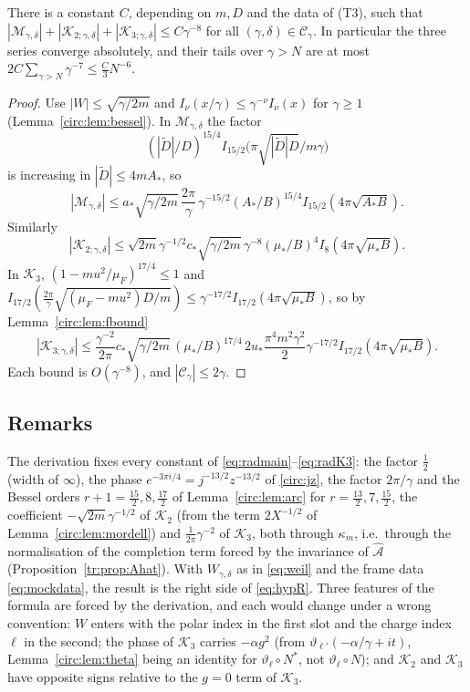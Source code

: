 \begin{lemma}\label{circ:lem:conv}
There is a constant $C$, depending on $m,D$ and the data of \textup{(T3)}, such that $|\mathcal M_{\gamma,\delta}|+|\mathcal K_{2;\gamma,\delta}|+|\mathcal K_{3;\gamma,\delta}|\le C\gamma^{-8}$ for all $(\gamma,\delta)\in\mathcal C_\gamma$. In particular the three series converge absolutely, and their tails over $\gamma>N$ are at most $2C\sum_{\gamma>N}\gamma^{-7}\le\frac C3N^{-6}$.
\end{lemma}

\begin{proof}
Use $|W|\le\sqrt{\gamma/2m}$ and $I_\nu(x/\gamma)\le\gamma^{-\nu}I_\nu(x)$ for $\gamma\ge1$ (Lemma~\ref{circ:lem:bessel}). In $\mathcal M_{\gamma,\delta}$ the factor
\[
(|\tilde D|/D)^{15/4}I_{15/2}\big(\pi\sqrt{|\tilde D|D}/m\gamma\big)
\]
is increasing in $|\tilde D|\le4mA_*$, so
\[
|\mathcal M_{\gamma,\delta}|\le a_*\sqrt{\gamma/2m}\,\frac{2\pi}\gamma\,\gamma^{-15/2}(A_*/B)^{15/4}I_{15/2}(4\pi\sqrt{A_*B}).
\]
Similarly
\[
|\mathcal K_{2;\gamma,\delta}|\le\sqrt{2m}\gamma^{-1/2}c_*\sqrt{\gamma/2m}\,\gamma^{-8}(\mu_*/B)^4I_8(4\pi\sqrt{\mu_*B}).
\]
In $\mathcal K_3$, $(1-mu^2/\mu_F)^{17/4}\le1$ and $I_{17/2}(\frac{2\pi}\gamma\sqrt{(\mu_F-mu^2)D/m})\le\gamma^{-17/2}I_{17/2}(4\pi\sqrt{\mu_*B})$, so by Lemma~\ref{circ:lem:fbound}
\[
|\mathcal K_{3;\gamma,\delta}|\le\frac{\gamma^{-2}}{2\pi}c_*\sqrt{\gamma/2m}\,(\mu_*/B)^{17/4}\,2u_*\frac{\pi^4m^2\gamma^2}2\gamma^{-17/2}I_{17/2}(4\pi\sqrt{\mu_*B}).
\]
Each bound is $O(\gamma^{-8})$, and $|\mathcal C_\gamma|\le2\gamma$.
\end{proof}

\subsection{Remarks}\label{circ:remarks}

\begin{remark}
The derivation fixes every constant of \eqref{eq:radmain}--\eqref{eq:radK3}: the factor $\frac12$ (width of $\infty$), the phase $e^{-3\pi i/4}=j^{-13/2}z^{-13/2}$ of \eqref{circ:jz}, the factor $2\pi/\gamma$ and the Bessel orders $r+1=\frac{15}2,8,\frac{17}2$ of Lemma~\ref{circ:lem:arc} for $r=\frac{13}2,7,\frac{15}2$, the coefficient $-\sqrt{2m}\gamma^{-1/2}$ of $\mathcal K_2$ (from the term $2X^{-1/2}$ of Lemma~\ref{circ:lem:mordell}) and $\frac1{2\pi}\gamma^{-2}$ of $\mathcal K_3$, both through $\kappa_m$, i.e.\ through the normalisation of the completion term forced by the invariance of $\widehat{\mathcal A}$ (Proposition~\ref{tr:prop:Ahat}). With $W_{\gamma,\delta}$ as in \eqref{eq:weil} and the frame data \eqref{eq:mockdata}, the result is the right side of \eqref{eq:hypR}. Three features of the formula are forced by the derivation, and each would change under a wrong convention: $W$ enters with the polar index in the first slot and the charge index $\ell$ in the second; the phase of $\mathcal K_3$ carries $-\alpha g^2$ (from $\vartheta_{\ell'}(-\alpha/\gamma+it)$, Lemma~\ref{circ:lem:theta} being an identity for $\vartheta_\ell\circ N^*$, not $\vartheta_\ell\circ N$); and $\mathcal K_2$ and $\mathcal K_3$ have opposite signs relative to the $g=0$ term of $\mathcal K_3$.
\end{remark}

